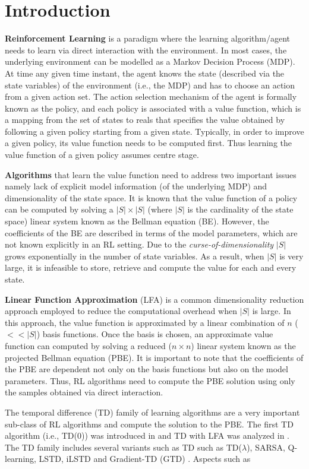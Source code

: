\section{Introduction}
\textbf{Reinforcement Learning} is a paradigm where the learning algorithm/agent needs to learn via direct interaction with the environment. In most cases, the underlying environment can be modelled as a Markov Decision Process (MDP). At time any given time instant, the agent knows the state (described via the state variables) of the environment (i.e., the MDP) and has to choose an action from a given action set. The action selection mechanism of the agent is formally known as the policy, and each policy is associated with a value function, which is a mapping from the set of states to reals that specifies the value obtained by following a given policy starting from a given state. Typically, in order to improve a given policy, its value function needs to be computed first. Thus learning the value function of a given policy assumes centre stage.\par
\textbf{Algorithms} that learn the value function need to address two important issues namely lack of explicit model information (of the underlying MDP) and dimensionality of the state space. It is known that the value function of a policy can be computed by solving a $|S|\times|S|$ (where $|S|$ is the cardinality of the state space) linear system known as the Bellman equation (BE). However, the coefficients of the BE are described in terms of the model parameters, which are not known explicitly in an RL setting. Due to the \emph{curse-of-dimensionality} $|S|$ grows exponentially in the number of state variables. As a result, when $|S|$ is very large, it is infeasible to store, retrieve and compute the value for each and every state.\par
\textbf{Linear Function Approximation} (LFA) is a common dimensionality reduction approach employed to reduce the computational overhead when $|S|$ is large. In this approach, the value function is approximated by a linear combination of $n$ ($<<|S|$) basis functions. Once the basis is chosen, an approximate value function can computed by solving a reduced ($n\times n$) linear system known as the projected Bellman equation (PBE). It is important to note that the coefficients of the PBE are dependent not only on the basis functions but also on the model parameters. Thus, RL algorithms need to compute the PBE solution using only the samples obtained via direct interaction.\par
The temporal difference (TD) family of learning algorithms are a very important sub-class of RL algorithms and compute the solution to the PBE. The first TD algorithm (i.e., TD($0$)) was introduced in \cite{} and TD with LFA was analyzed in \cite{}. The TD family includes several variants such as TD such as TD($\lambda$), SARSA, Q-learning, LSTD, iLSTD and Gradient-TD (GTD) \cite{}. Aspects such as 
